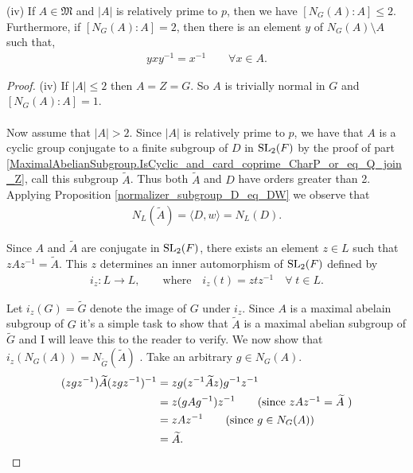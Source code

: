 \begin{theorem}
  \label{MaximalAbelianSubgroup.index_normalizer_le_two}
  \leanok
(iv) If $A \in \mathfrak{M}$ and $|A|$ is relatively prime to $p$, then we have $[N_G(A): A] \leq 2$. Furthermore, if $[N_G(A): A] = 2$, then there is an element $y$ of $N_G(A) \! \setminus \! A$ such that, 
\vspace{-1mm}
\begin{align*} yxy^{-1} = x^{-1} \qquad \forall x \in A.\end{align*}
\end{theorem}
\begin{proof}
  (iv) If $|A| \leq 2$ then $A=Z=G$. So $A$ is trivially normal in $G$ and $[N_G(A): A] = 1$. \\
  \\
  Now assume that $|A| > 2$. Since $|A|$ is relatively prime to $p$, we have that $A$ is a cyclic group conjugate to a finite subgroup of $D$ in $\operatorname{SL}_2(F)$ by the proof of part \ref{MaximalAbelianSubgroup.IsCyclic_and_card_coprime_CharP_or_eq_Q_join_Z}, call this subgroup ${\widetilde{A}}$. Thus both ${\widetilde{A}}$ and $D$ have orders greater than 2. Applying Proposition \ref{normalizer_subgroup_D_eq_DW} we observe that
  \begin{align}\label{norm1}  N_L({\widetilde{A}}) = \langle D , w \rangle = N_L(D).
  \end{align}
  
  Since $A$ and ${\widetilde{A}}$ are conjugate in $\operatorname{SL}_2(F)$, there exists an element $z \in L$ such that $zAz^{-1} = {\widetilde{A}}$. This $z$ determines an inner automorphism of $\operatorname{SL}_2(F)$ defined by
  \begin{align*} 
      i_z: L \longrightarrow L,  \qquad \text{where} \quad  i_z(t) = z t z^{-1}  \quad \forall \; t \in L.
  \end{align*}
  
  Let $i_z(G) = {\widetilde{G}}$ denote the image of $G$ under $i_z$. Since $A$ is a maximal abelain subgroup of $G$ it's a simple task to show that ${\widetilde{A}}$ is a maximal abelian subgroup of ${\widetilde{G}}$ and I will leave this to the reader to verify. We now show that $i_z(N_G(A)) = N_{\widetilde{G}}({\widetilde{A}})$ . Take an arbitrary $g \in N_G(A)$.
  \begin{align*} (z g z^{-1}) {\widetilde{A}} (z g z^{-1})^{-1} &= z g (z^{-1} {\widetilde{A}} z) g^{-1} z^{-1}
  \\ &=  z (g A g^{-1}) z^{-1} \tag{since $zAz^{-1} = {\widetilde{A}}$ }
  \\ &= z A z^{-1} \tag{since $g \in N_G(A)$}
  \\ &= {\widetilde{A}}.
  \end{align*}
  

\end{proof}
